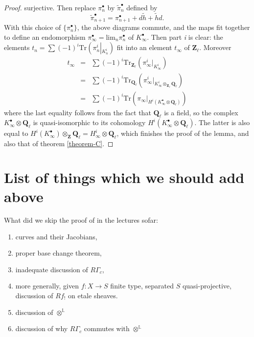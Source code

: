 \begin{proof}
surjective. Then replace $\pi_n^\bullet$ by $\tilde\pi_n^\bullet$ defined by
$$
\tilde\pi_{n+1}^\bullet = \pi_{n+1}^\bullet + d\tilde h+\tilde hd.
$$
With this choice of $\{\pi_n^\bullet\}$, the above diagrams commute, and the
maps fit together to define an endomorphism $\pi_\infty^\bullet =
\text{lim}_n\pi_n^\bullet$ of $K_\infty^\bullet$. Then part {\it i} is clear:
the elements $t_n = \sum(-1)^i
\text{Tr}\left(\pi_n^i\left|_{K_n^i}\right.\right)$ fit into an element
$t_\infty$ of $\mathbf{Z}_\ell$. Moreover
\begin{eqnarray*}
t_\infty & = & \sum(-1)^i
\text{Tr}_{\mathbf{Z}_\ell}\left(\pi_\infty^i\big|_{K_\infty^i}\right) \\
& = & \sum(-1)^i
\text{Tr}_{\mathbf{Q}_\ell}\left(\pi_\infty^i\big|_{K_\infty^i\otimes_{\mathbf{Z
}_\ell}\mathbf{Q}_\ell}\right)\\
& =
&\sum(-1)^i\text{Tr}\left(\pi_\infty\big|_{H^i(K_\infty^\bullet\otimes\mathbf{Q}
_\ell)}\right)
\end{eqnarray*}
where the last equality follows from the fact that $\mathbf{Q}_\ell$ is a
field, so the complex $K_\infty^\bullet\otimes\mathbf{Q}_\ell$ is
quasi-isomorphic to its cohomology
$H^i(K_\infty^\bullet\otimes\mathbf{Q}_\ell)$. The latter is also equal to
$H^i(K_\infty^\bullet)\otimes_{\mathbf{Z}}\mathbf{Q}_\ell = H_\infty^i\otimes
\mathbf{Q}_\ell$, which finishes the proof of the lemma, and also that of
theorem \ref{theorem-C}.
\end{proof}




\section{List of things which we should add above}
\label{section-list-skipped}

\noindent
What did we skip the proof of in the lectures sofar:
\begin{enumerate}
\item curves and their Jacobians,
\item proper base change theorem,
\item inadequate discussion of $R\Gamma_c$,
\item more generally, given $f : X \to S$ finite type,
separated $S$ quasi-projective, discussion of $Rf_!$ on etale sheaves.
\item discussion of $\otimes^{\mathbb{L}}$
\item discussion of why $R\Gamma_c$ commutes with $\otimes^{\mathbb L}$
\end{enumerate}






